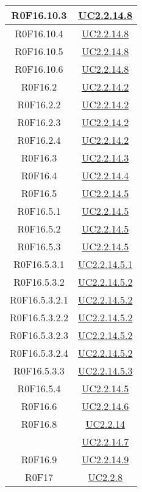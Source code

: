 \documentclass[../AnalisiDeiRequisiti.tex]{subfiles}
\begin{document}
\begin{longtable}{|c|c|}
	R0F16.10.3 & \hyperlink{UC2.2.14.8}{UC2.2.14.8}\\\hline
	R0F16.10.4 & \hyperlink{UC2.2.14.8}{UC2.2.14.8}\\\hline
	R0F16.10.5 & \hyperlink{UC2.2.14.8}{UC2.2.14.8}\\\hline
	R0F16.10.6 & \hyperlink{UC2.2.14.8}{UC2.2.14.8}\\\hline
	R0F16.2 & \hyperlink{UC2.2.14.2}{UC2.2.14.2}\\\hline
	R0F16.2.2 & \hyperlink{UC2.2.14.2}{UC2.2.14.2}\\\hline
	R0F16.2.3 & \hyperlink{UC2.2.14.2}{UC2.2.14.2}\\\hline
	R0F16.2.4 & \hyperlink{UC2.2.14.2}{UC2.2.14.2}\\\hline
	R0F16.3 & \hyperlink{UC2.2.14.3}{UC2.2.14.3}\\\hline
	R0F16.4 & \hyperlink{UC2.2.14.4}{UC2.2.14.4}\\\hline
	R0F16.5 & \hyperlink{UC2.2.14.5}{UC2.2.14.5}\\\hline
	R0F16.5.1 & \hyperlink{UC2.2.14.5}{UC2.2.14.5}\\\hline
	R0F16.5.2 & \hyperlink{UC2.2.14.5}{UC2.2.14.5}\\\hline
	R0F16.5.3 & \hyperlink{UC2.2.14.5}{UC2.2.14.5}\\\hline
	R0F16.5.3.1 & \hyperlink{UC2.2.14.5.1}{UC2.2.14.5.1}\\\hline
	R0F16.5.3.2 & \hyperlink{UC2.2.14.5.2}{UC2.2.14.5.2}\\\hline
	R0F16.5.3.2.1 & \hyperlink{UC2.2.14.5.2}{UC2.2.14.5.2}\\\hline
	R0F16.5.3.2.2 & \hyperlink{UC2.2.14.5.2}{UC2.2.14.5.2}\\\hline
	R0F16.5.3.2.3 & \hyperlink{UC2.2.14.5.2}{UC2.2.14.5.2}\\\hline
	R0F16.5.3.2.4 & \hyperlink{UC2.2.14.5.2}{UC2.2.14.5.2}\\\hline
	R0F16.5.3.3 & \hyperlink{UC2.2.14.5.3}{UC2.2.14.5.3}\\\hline
	R0F16.5.4 & \hyperlink{UC2.2.14.5}{UC2.2.14.5}\\\hline
	R0F16.6 & \hyperlink{UC2.2.14.6}{UC2.2.14.6}\\\hline
	R0F16.8 & \hyperlink{UC2.2.14}{UC2.2.14}\\& \hyperlink{UC2.2.14.7}{UC2.2.14.7}\\\hline
	R0F16.9 & \hyperlink{UC2.2.14.9}{UC2.2.14.9}\\\hline
	R0F17 & \hyperlink{UC2.2.8}{UC2.2.8}\\\hline

\end{longtable}
\end{document}
